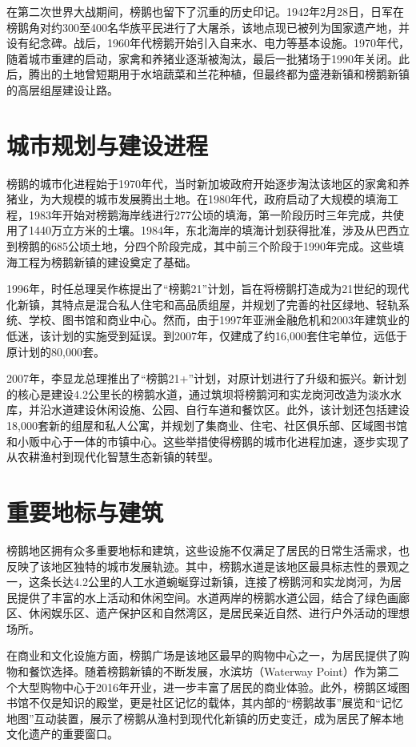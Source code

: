 \documentclass[11pt,a4paper,twoside,openany]{book}
\begin{document}
在第二次世界大战期间，榜鹅也留下了沉重的历史印记。1942年2月28日，日军在榜鹅角对约300至400名华族平民进行了大屠杀，该地点现已被列为国家遗产地，并设有纪念碑。战后，1960年代榜鹅开始引入自来水、电力等基本设施。1970年代，随着城市重建的启动，家禽和养猪业逐渐被淘汰，最后一批猪场于1990年关闭。此后，腾出的土地曾短期用于水培蔬菜和兰花种植，但最终都为盛港新镇和榜鹅新镇的高层组屋建设让路。

\section{城市规划与建设进程}
榜鹅的城市化进程始于1970年代，当时新加坡政府开始逐步淘汰该地区的家禽和养猪业，为大规模的城市发展腾出土地。在1980年代，政府启动了大规模的填海工程，1983年开始对榜鹅海岸线进行277公顷的填海，第一阶段历时三年完成，共使用了1440万立方米的土壤。1984年，东北海岸的填海计划获得批准，涉及从巴西立到榜鹅的685公顷土地，分四个阶段完成，其中前三个阶段于1990年完成。这些填海工程为榜鹅新镇的建设奠定了基础。

1996年，时任总理吴作栋提出了“榜鹅21”计划，旨在将榜鹅打造成为21世纪的现代化新镇，其特点是混合私人住宅和高品质组屋，并规划了完善的社区绿地、轻轨系统、学校、图书馆和商业中心。然而，由于1997年亚洲金融危机和2003年建筑业的低迷，该计划的实施受到延误。到2007年，仅建成了约16,000套住宅单位，远低于原计划的80,000套。

2007年，李显龙总理推出了“榜鹅21+”计划，对原计划进行了升级和振兴。新计划的核心是建设4.2公里长的榜鹅水道，通过筑坝将榜鹅河和实龙岗河改造为淡水水库，并沿水道建设休闲设施、公园、自行车道和餐饮区。此外，该计划还包括建设18,000套新的组屋和私人公寓，并规划了集商业、住宅、社区俱乐部、区域图书馆和小贩中心于一体的市镇中心。这些举措使得榜鹅的城市化进程加速，逐步实现了从农耕渔村到现代化智慧生态新镇的转型。

\section{重要地标与建筑}
榜鹅地区拥有众多重要地标和建筑，这些设施不仅满足了居民的日常生活需求，也反映了该地区独特的城市发展轨迹。其中，榜鹅水道是该地区最具标志性的景观之一，这条长达4.2公里的人工水道蜿蜒穿过新镇，连接了榜鹅河和实龙岗河，为居民提供了丰富的水上活动和休闲空间。水道两岸的榜鹅水道公园，结合了绿色画廊区、休闲娱乐区、遗产保护区和自然湾区，是居民亲近自然、进行户外活动的理想场所。

在商业和文化设施方面，榜鹅广场是该地区最早的购物中心之一，为居民提供了购物和餐饮选择。随着榜鹅新镇的不断发展，水滨坊（Waterway Point）作为第二个大型购物中心于2016年开业，进一步丰富了居民的商业体验。此外，榜鹅区域图书馆不仅是知识的殿堂，更是社区记忆的载体，其内部的“榜鹅故事”展览和“记忆地图”互动装置，展示了榜鹅从渔村到现代化新镇的历史变迁，成为居民了解本地文化遗产的重要窗口。
\end{document}
